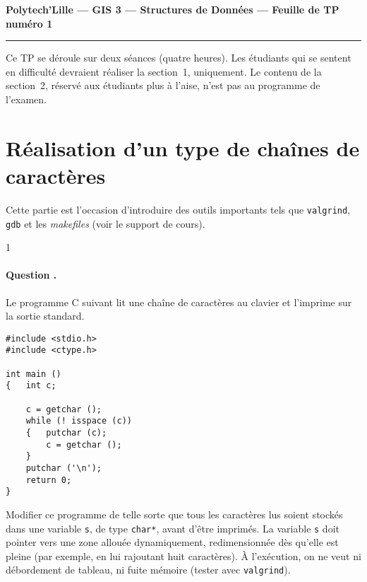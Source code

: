 \documentclass[12pt]{article}
\newcounter{question_counter}
\newcommand{\question}{\addtocounter{question_counter}1 %
    \paragraph{\bf Question \arabic{question_counter}.}}
\newcounter{points_counter}
\newcounter{section_points_counter}
\begin{document}
\begin{center}
{\bf Polytech'Lille --- GIS 3 --- Structures de Données --- Feuille de TP numéro 1}
 
\end{center}
\medskip
\hrule
 
\bigskip

Ce TP se déroule sur deux séances (quatre heures). Les étudiants qui se
sentent en difficulté devraient réaliser la section~1, uniquement. 
Le contenu de la section~2, réservé aux étudiants plus à l'aise, 
n'est pas au programme de l'examen. 

\section{Réalisation d'un type de chaînes de caractères}

Cette partie est l'occasion d'introduire des outils importants tels 
que {\tt valgrind}, {\tt gdb} et les {\em makefiles} (voir le support
de cours). 

\question
Le programme C suivant lit une chaîne de caractères au clavier
et l'imprime sur la sortie standard.
\begin{verbatim}
#include <stdio.h>
#include <ctype.h>

int main ()
{   int c;

    c = getchar ();
    while (! isspace (c))
    {   putchar (c);
        c = getchar ();
    }
    putchar ('\n');
    return 0;
}
\end{verbatim}
Modifier ce programme de telle sorte que tous les caractères lus soient
stockés dans une variable \texttt{s}, de type \texttt{char*}, avant d'être imprimés.
La variable \texttt{s} doit pointer vers une zone allouée dynamiquement, 
redimensionnée dès qu'elle est pleine (par exemple, en lui rajoutant huit
caractères). À l'exécution, on ne veut ni débordement de tableau, ni 
fuite mémoire (tester avec \texttt{valgrind}).
\end{document}
